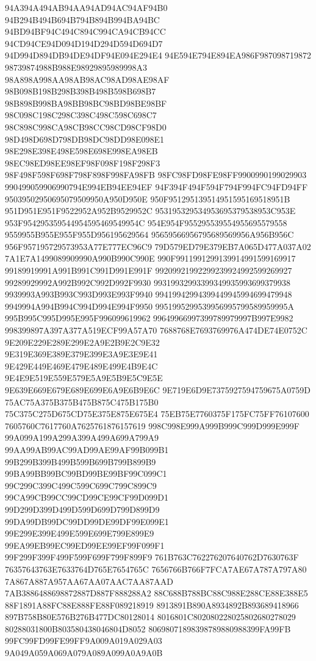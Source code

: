 94A394A494AB94AA94AD94AC94AF94B0
94B294B494B694B794B894B994BA94BC
94BD94BF94C494C894C994CA94CB94CC
94CD94CE94D094D194D294D594D694D7
94D994D894DB94DE94DF94E094E294E4
94E594E794E894EA986F987098719872
98739874988B988E98929895989998A3
98A898A998AA98AB98AC98AD98AE98AF
98B098B198B298B398B498B598B698B7
98B898B998BA98BB98BC98BD98BE98BF
98C098C198C298C398C498C598C698C7
98C898C998CA98CB98CC98CD98CF98D0
98D498D698D798DB98DC98DD98E098E1
98E298E398E498E598E698E998EA98EB
98EC98ED98EE98EF98F098F198F298F3
98F498F598F698F798F898F998FA98FB
98FC98FD98FE98FF9900990199029903
990499059906990794E994EB94EE94EF
94F394F494F594F794F994FC94FD94FF
95039502950695079509950A950D950E
950F951295139514951595169518951B
951D951E951F9522952A952B9529952C
953195329534953695379538953C953E
953F954295359544954595469549954C
954E954F955295539554955695579558
9559955B955E955F955D956195629564
95659566956795689569956A956B956C
956F957195729573953A77E777EC96C9
79D579ED79E379EB7A065D477A037A02
7A1E7A1499089909990A990B990C990E
990F9911991299139914991599169917
99189919991A991B991C991D991E991F
99209921992299239924992599269927
99289929992A992B992C992D992F9930
99319932993399349935993699379938
9939993A993B993C993D993E993F9940
99419942994399449945994699479948
9949994A994B994C994D994E994F9950
9951995299539956995799589959995A
995B995C995D995E995F996099619962
99649966997399789979997B997E9982
998399897A397A377A519ECF99A57A70
7688768E7693769976A474DE74E0752C
9E209E229E289E299E2A9E2B9E2C9E32
9E319E369E389E379E399E3A9E3E9E41
9E429E449E469E479E489E499E4B9E4C
9E4E9E519E559E579E5A9E5B9E5C9E5E
9E639E669E679E689E699E6A9E6B9E6C
9E719E6D9E7375927594759675A0759D
75AC75A375B375B475B875C475B175B0
75C375C275D675CD75E375E875E675E4
75EB75E7760375F175FC75FF76107600
7605760C7617760A7625761876157619
998C998E999A999B999C999D999E999F
99A099A199A299A399A499A699A799A9
99AA99AB99AC99AD99AE99AF99B099B1
99B299B399B499B599B699B799B899B9
99BA99BB99BC99BD99BE99BF99C099C1
99C299C399C499C599C699C799C899C9
99CA99CB99CC99CD99CE99CF99D099D1
99D299D399D499D599D699D799D899D9
99DA99DB99DC99DD99DE99DF99E099E1
99E299E399E499E599E699E799E899E9
99EA99EB99EC99ED99EE99EF99F099F1
99F299F399F499F599F699F799F899F9
761B763C762276207640762D7630763F
76357643763E7633764D765E7654765C
7656766B766F7FCA7AE67A787A797A80
7A867A887A957AA67AA07AAC7AA87AAD
7AB3886488698872887D887F888288A2
88C688B788BC88C988E288CE88E388E5
88F1891A88FC88E888FE88F089218919
8913891B890A8934892B893689418966
897B758B80E576B276B477DC80128014
8016801C802080228025802680278029
80288031800B803580438046804D8052
80698071898398789880988399FA99FB
99FC99FD99FE99FF9A009A019A029A03
9A049A059A069A079A089A099A0A9A0B
